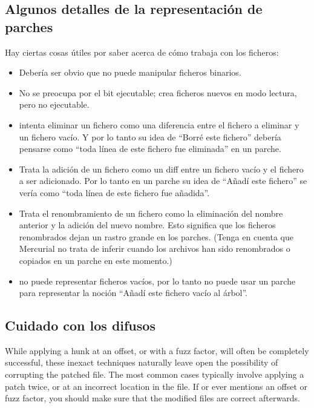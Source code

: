 \subsection{Algunos detalles de la representación de parches}

Hay ciertas cosas útiles por saber acerca de cómo trabaja
 con los ficheros:
\begin{itemize}
\item Debería ser obvio que  no puede manipular
  ficheros binarios.
\item No se preocupa por el bit ejecutable; crea ficheros nuevos en
  modo lectura, pero no ejecutable.
\item {} intenta eliminar un fichero como una diferencia
  entre el fichero a eliminar y un fichero vacío.  Y por lo tanto su
  idea de ``Borré este fichero'' debería pensarse como ``toda línea de
  este fichero fue eliminada'' en un parche.
\item Trata la adición de un fichero como un diff entre un fichero
  vacío y el fichero a ser adicionado.  Por lo tanto en un parche su
  idea de ``Añadí este fichero'' se vería como ``toda línea de este
  fichero fue añadida''.
\item Trata el renombramiento de un fichero como la eliminación del
  nombre anterior y la adición del nuevo nombre.  Esto significa que
  los ficheros renombrados dejan un rastro grande en los parches.
  (Tenga en cuenta que Mercurial no trata de inferir cuando los
  archivos han sido renombrados o copiados en un parche en este
  momento.)
\item {} no puede representar ficheros vacíos, por lo
  tanto no puede usar un parche para representar la noción ``Añadí
  este fichero vacío al árbol''.
\end{itemize}
\subsection{Cuidado con los difusos}

While applying a hunk at an offset, or with a fuzz factor, will often
be completely successful, these inexact techniques naturally leave
open the possibility of corrupting the patched file.  The most common
cases typically involve applying a patch twice, or at an incorrect
location in the file.  If  or  ever
mentions an offset or fuzz factor, you should make sure that the
modified files are correct afterwards.  

